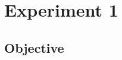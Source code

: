 \documentclass[preprint,12pt]{elsarticle}
\newcommand{\ie}{\emph{i.\,e.}}
\newcommand{\cf}{cf.}
\begin{document}
\section{Experiment 1}
\label{sec:simulation}

\subsection{Objective}

%
%
%
%
%
\end{document}
